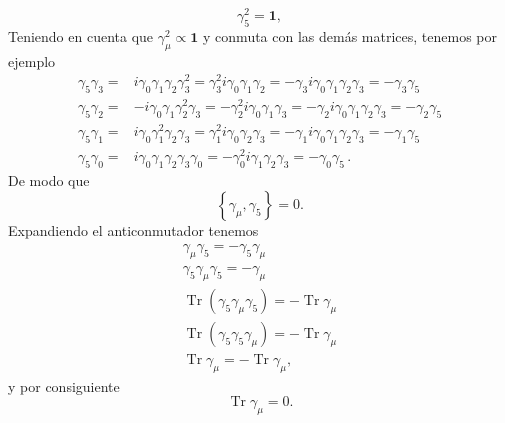 \begin{equation}
  \gamma_5^2=\mathbf{1},
\end{equation}
Teniendo en cuenta que $\gamma_\mu^2\propto\mathbf{1}$ y conmuta con las demás matrices, tenemos por ejemplo
\begin{align}
  \gamma_5\gamma_3=&i\gamma_0\gamma_1\gamma_2\gamma_3^2=\gamma_3^2i\gamma_0\gamma_1\gamma_2=-\gamma_3i\gamma_0\gamma_1\gamma_2\gamma_3=-\gamma_3\gamma_5\nonumber\\
  \gamma_5\gamma_2=&-i\gamma_0\gamma_1\gamma_2^2\gamma_3=-\gamma_2^2i\gamma_0\gamma_1\gamma_3=-\gamma_2i\gamma_0\gamma_1\gamma_2\gamma_3=-\gamma_2\gamma_5\nonumber\\
  \gamma_5\gamma_1=&i\gamma_0\gamma_1^2\gamma_2\gamma_3=\gamma_1^2i\gamma_0\gamma_2\gamma_3=-\gamma_1i\gamma_0\gamma_1\gamma_2\gamma_3=-\gamma_1\gamma_5\nonumber\\
  \gamma_5\gamma_0=&i\gamma_0\gamma_1\gamma_2\gamma_3\gamma_0=-\gamma_0^2i\gamma_1\gamma_2\gamma_3=-\gamma_0\gamma_5\,.
\end{align}
De modo que
\begin{equation}
  \label{eq:218qft}
  \left\{\gamma_\mu,\gamma_5\right\}=0. 
\end{equation}
Expandiendo el anticonmutador tenemos
\begin{align}
  \gamma_\mu\gamma_5=-\gamma_5\gamma_\mu\nonumber\\
  \gamma_5\gamma_\mu\gamma_5=-\gamma_\mu\nonumber\\
\operatorname{Tr}\left(\gamma_5\gamma_\mu\gamma_5\right)=-\operatorname{Tr}\gamma_\mu\nonumber\\
\operatorname{Tr}\left(\gamma_5\gamma_5\gamma_\mu\right)=-\operatorname{Tr}\gamma_\mu\nonumber\\
\operatorname{Tr}\gamma_\mu=-\operatorname{Tr}\gamma_\mu,
\end{align}
y por consiguiente
\begin{equation}
  \operatorname{Tr}\gamma_\mu=0.
\end{equation}


